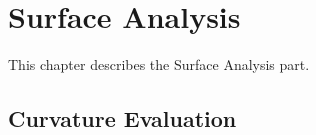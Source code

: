 \chapter{Surface Analysis}
\label{surfaceanalysis}
This chapter describes the Surface Analysis part.
\section{Curvature Evaluation}

\pgsbreak

\pgsbreak

\pgsbreak

\pgsbreak

\pgsbreak

\pgsbreak

\pgsbreak

\pgsbreak

\pgsbreak

\pgsbreak

\pgsbreak

\pgsbreak
